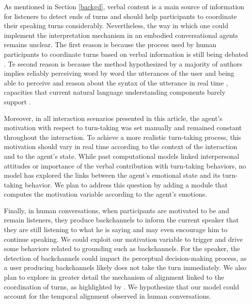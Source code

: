 \documentclass[twocolumn]{svjour3}
\begin{document}
As mentioned in Section \ref{backgd}, verbal content is a main source of information for listeners to detect ends of turns \cite{de_ruiter_projecting_2006} and should  help participants to coordinate their speaking turns considerably. Nevertheless, the way in which one could implement the interpretation mechanism in an embodied conversational agents remains unclear. The first reason is because the process used by human participants to coordinate turns based on verbal information is still being debated \citep{heldner_pauses_2010,magyari_prediction_2012,riest_anticipation_2015}. Te second reason is because the method hypothesized by a majority of authors implies reliably  perceiving word by word the utterances of the user and being able to perceive and reason about the syntax of the utterance in real time \citep{sacks_simplest_1974}, capacities that current natural language understanding components barely support \cite{de_vault_incremental_2011}.

Moreover, in all interaction scenarios presented in this article, the agent's motivation with respect to turn-taking was set manually and remained constant throughout the interaction. To achieve a more realistic turn-taking process, this motivation should vary in real time according to the context of the interaction and to the agent's state.
While past computational models linked interpersonal attitudes \citep{ravenet_conversational_2015} or importance of the verbal contribution \citep{selfridge_bidding_2009} with turn-taking behaviors, no model has explored the links between the agent's emotional state and its turn-taking behavior. We plan to address this question by adding a module that computes the motivation variable according to the agent's emotions.

Finally, in human conversations, when participants are motivated to be and remain listeners, they produce backchannels to inform the current speaker that they are still listening to what he is saying and may even encourage him to continue speaking. 
We could exploit our motivation variable to trigger and drive some behaviors related to grounding such as backchannels. 
For the speaker, the detection of backchannels could impact its perceptual decision-making process, as a user producing backchannels likely does not take the turn immediately.
We also plan to explore in greater detail the mechanism of alignment linked to the coordination of turns, as highlighted by \citep{benus_pragmatic_2011}.
We hypothesize that our model could account for the temporal alignment observed in human conversations.  




\end{document}
